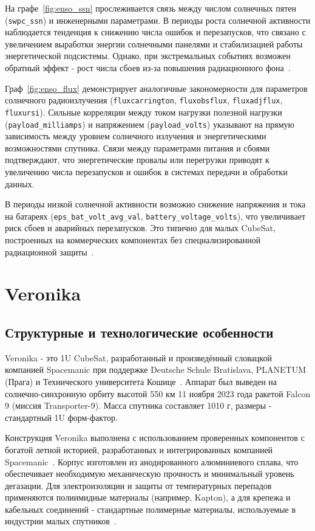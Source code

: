 На графе~\ref{fig:enso_ssn} прослеживается связь между числом солнечных пятен
(\texttt{swpc\_ssn}) и инженерными параметрами. В периоды роста солнечной
активности наблюдается тенденция к снижению числа ошибок и перезапусков, что
связано с увеличением выработки энергии солнечными панелями и стабилизацией
работы энергетической подсистемы. Однако, при экстремальных событиях возможен
обратный эффект - рост числа сбоев из-за повышения радиационного
фона~\cite{nasa_shielding}.

Граф~\ref{fig:enso_flux} демонстрирует аналогичные закономерности для параметров
солнечного радиоизлучения (\texttt{fluxcarrington}, \texttt{fluxobsflux},
\texttt{fluxadjflux}, \texttt{fluxursi}). Сильные корреляции между током
нагрузки полезной нагрузки (\texttt{payload\_milliamps}) и напряжением
(\texttt{payload\_volts}) указывают на прямую зависимость между уровнем
солнечного излучения и энергетическими возможностями спутника. Связи между
параметрами питания и сбоями подтверждают, что энергетические провалы или
перегрузки приводят к увеличению числа перезапусков и ошибок в системах передачи
и обработки данных.

В периоды низкой солнечной активности возможно снижение напряжения и тока на
батареях (\texttt{eps\_bat\_volt\_avg\_val}, \texttt{battery\_voltage\_volts}),
что увеличивает риск сбоев и аварийных перезапусков. Это типично для малых
CubeSat, построенных на коммерческих компонентах без специализированной
радиационной защиты~\cite{expleo_enso_pdf, nanosats_enso}.


\section{Veronika}

\subsection{Структурные и технологические особенности}

Veronika - это 1U CubeSat, разработанный и произведённый словацкой компанией
Spacemanic при поддержке Deutsche Schule Bratislava, PLANETUM (Прага) и
Технического университета Кошице~\cite{spacemanic_veronika, nanosats_veronika,
	satnogs_veronika, kozmonautika_veronika}. Аппарат был выведен на
солнечно-синхронную орбиту высотой 550 км 11 ноября 2023 года ракетой Falcon 9
(миссия Transporter-9). Масса спутника составляет 1010 г, размеры - стандартный
1U форм-фактор.

Конструкция Veronika выполнена с использованием проверенных компонентов с
богатой летной историей, разработанных и интегрированных компанией
Spacemanic~\cite{spacemanic_veronika, nanosats_veronika}. Корпус изготовлен из
анодированного алюминиевого сплава, что обеспечивает необходимую механическую
прочность и минимальный уровень дегазации. Для электроизоляции и защиты от
температурных перепадов применяются полиимидные материалы (например, Kapton), а
для крепежа и кабельных соединений - стандартные полимерные материалы,
используемые в индустрии малых спутников~\cite{spacemanic_veronika,
	kozmonautika_veronika}.

